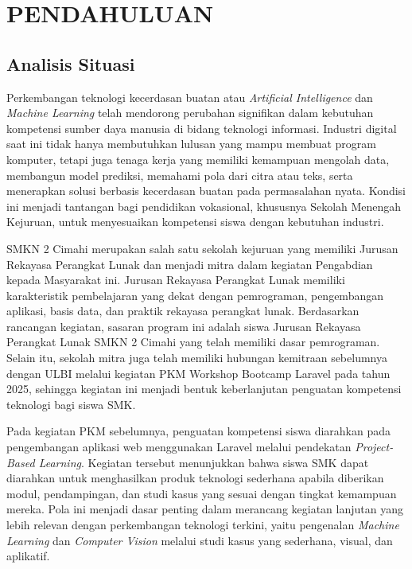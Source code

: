 \section{PENDAHULUAN}

\subsection{Analisis Situasi}

Perkembangan teknologi kecerdasan buatan atau \textit{Artificial Intelligence} dan \textit{Machine Learning} telah mendorong perubahan signifikan dalam kebutuhan kompetensi sumber daya manusia di bidang teknologi informasi. Industri digital saat ini tidak hanya membutuhkan lulusan yang mampu membuat program komputer, tetapi juga tenaga kerja yang memiliki kemampuan mengolah data, membangun model prediksi, memahami pola dari citra atau teks, serta menerapkan solusi berbasis kecerdasan buatan pada permasalahan nyata. Kondisi ini menjadi tantangan bagi pendidikan vokasional, khususnya Sekolah Menengah Kejuruan, untuk menyesuaikan kompetensi siswa dengan kebutuhan industri.

SMKN 2 Cimahi merupakan salah satu sekolah kejuruan yang memiliki Jurusan Rekayasa Perangkat Lunak dan menjadi mitra dalam kegiatan Pengabdian kepada Masyarakat ini. Jurusan Rekayasa Perangkat Lunak memiliki karakteristik pembelajaran yang dekat dengan pemrograman, pengembangan aplikasi, basis data, dan praktik rekayasa perangkat lunak. Berdasarkan rancangan kegiatan, sasaran program ini adalah siswa Jurusan Rekayasa Perangkat Lunak SMKN 2 Cimahi yang telah memiliki dasar pemrograman. Selain itu, sekolah mitra juga telah memiliki hubungan kemitraan sebelumnya dengan ULBI melalui kegiatan PKM Workshop Bootcamp Laravel pada tahun 2025, sehingga kegiatan ini menjadi bentuk keberlanjutan penguatan kompetensi teknologi bagi siswa SMK.

Pada kegiatan PKM sebelumnya, penguatan kompetensi siswa diarahkan pada pengembangan aplikasi web menggunakan Laravel melalui pendekatan \textit{Project-Based Learning}. Kegiatan tersebut menunjukkan bahwa siswa SMK dapat diarahkan untuk menghasilkan produk teknologi sederhana apabila diberikan modul, pendampingan, dan studi kasus yang sesuai dengan tingkat kemampuan mereka. Pola ini menjadi dasar penting dalam merancang kegiatan lanjutan yang lebih relevan dengan perkembangan teknologi terkini, yaitu pengenalan \textit{Machine Learning} dan \textit{Computer Vision} melalui studi kasus yang sederhana, visual, dan aplikatif.

